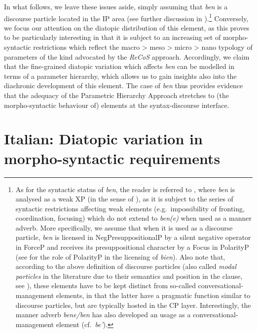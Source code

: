 \documentclass[output=paper]{langsci/langscibook}
\begin{document}
In what follows, we leave these issues aside, simply assuming that 
\emph{ben} is a discourse particle located in the IP area (see further
discussion in \citealt{CognSchi2018b,CognSchi2018}).\footnote{As for the
    syntactic status of \emph{ben}, the reader is referred to
    \textcite{CognSchi2015,CognSchi2018b,CognSchi2018}, where \emph{ben} is
    analysed as a weak XP (in the sense of \citealt{CarSta1999}), as it is
    subject to the series of syntactic restrictions affecting weak elements
    (e.g.\ impossibility of fronting, coordination, focusing) which do not
    extend to \emph{ben(e)} when used as a manner adverb. More specifically, we
    assume that when it is used as a discourse particle, \emph{ben} is licensed
    in NegPresuppositionalP by a silent negative operator in ForceP and
    receives its presuppositional character by a Focus in PolarityP (see
    \citealt{Hernanz2010} for the role of PolarityP in the licensing of 
    \emph{bien}). Also note that, according to the above definition of
    discourse particles (also called \emph{modal particles} in the literature
    due to their semantics and position in the clause, see
    \citealt{Weydt1969}), these elements have to be kept distinct from
    so-called conversational-management elements, in that the latter have a
    pragmatic function similar to discourse particles, but are typically hosted
    in the CP layer. Interestingly, the  manner adverb \emph{bene/ben}
    has also developed an usage as a conversational-management element (cf.\
\emph{be’}).} Conversely, we focus our attention on the diatopic
distribution of this element, as this proves to be particularly interesting in
that it is subject to an increasing set of morpho-syntactic restrictions which
reflect the macro > meso > micro > nano typology of parameters of the kind
advocated by the \emph{ReCoS} approach.  Accordingly, we claim that the
fine-grained diatopic variation which affects \ili{Italian} \emph{ben} can be
modelled in terms of a parameter hierarchy,\is{parameter hierarchies} which allows us to gain insights
also into the diachronic development of this element. The case of \ili{Italian}
\emph{ben} thus provides evidence that the adequacy of the Parametric Hierarchy
Approach stretches to (the morpho-syntactic behaviour of) elements at the
syntax-discourse interface.

\section{Italian: Diatopic variation in morpho-syntactic requirements}\label{sec:23-diatopic}
\end{document}
